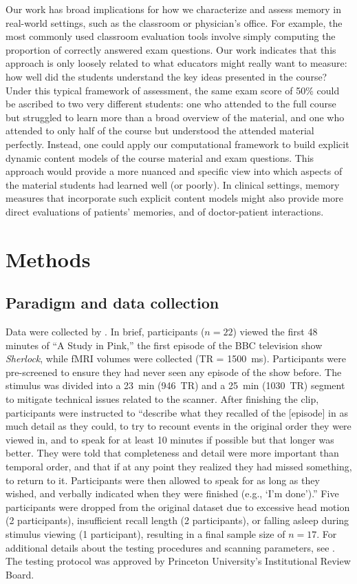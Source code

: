 \documentclass[10pt]{article}
\begin{document}
Our work has broad implications for how we characterize and assess memory in real-world settings, such as the classroom or physician's office.  For example, the most commonly used classroom evaluation tools involve simply computing the proportion of correctly answered exam questions.  Our work indicates that this approach is only loosely related to what educators might really want to measure: how well did the students understand the key ideas presented in the course?  Under this typical framework of assessment, the same exam score of 50\% could be ascribed to two very different students: one who attended to the full course but struggled to learn more than a broad overview of the material, and one who attended to only half of the course but understood the attended material perfectly.  Instead, one could apply our computational framework to build explicit dynamic content models of the course material and exam questions.  This approach would provide a more nuanced and specific view into which aspects of the material students had learned well (or poorly).  In clinical settings, memory measures that incorporate such explicit content models might also provide more direct evaluations of patients' memories, and of doctor-patient interactions.


\section*{Methods}
\label{sec:methods}

\subsection*{Paradigm and data collection}
Data were collected by \cite{ChenEtal17}.  In brief, participants ($n=22$) viewed the first 48 minutes of ``A Study in Pink,'' the first episode of the BBC television show \textit{Sherlock}, while fMRI volumes were collected (TR = 1500~ms).  Participants were pre-screened to ensure they had never seen any episode of the show before.  The stimulus was divided into a 23~min (946~TR) and a 25~min (1030~TR) segment to mitigate technical issues related to the scanner.  After finishing the clip, participants were instructed to \citep[quoting from][]{ChenEtal17} ``describe what they recalled of the [episode] in as much detail as they could, to try to recount events in the original order they were viewed in, and to speak for at least 10 minutes if possible but that longer was better. They were told that completeness and detail were more important than temporal order, and that if at any point they realized they had missed something, to return to it. Participants were then allowed to speak for as long as they wished, and verbally indicated when they were finished (e.g., `I’m done').''  Five participants were dropped from the original dataset due to excessive head motion (2 participants), insufficient recall length (2 participants), or falling asleep during stimulus viewing (1 participant), resulting in a final sample size of $n=17$.  For additional details about the testing procedures and scanning parameters, see \cite{ChenEtal17}.  The testing protocol was approved by Princeton University's Institutional Review Board.
\end{document}
